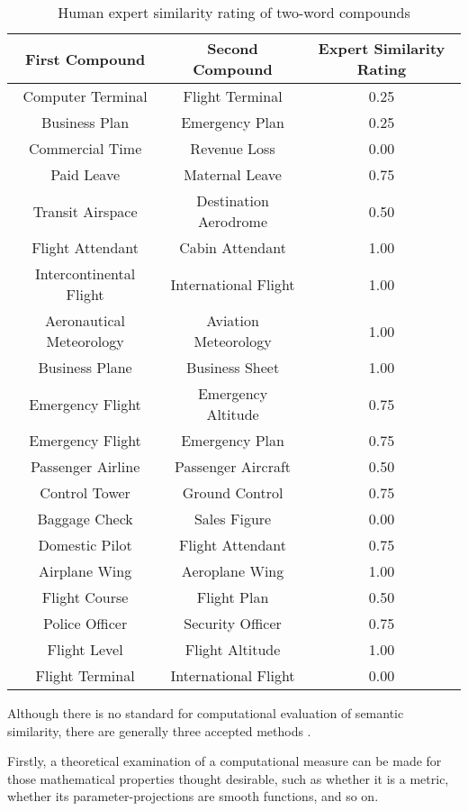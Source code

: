 \documentclass{article}
\begin{document}
\begin{table}[h!]
\centering
\begin{tabular}{|c|c||c|}
	\hline
	First Compound & Second Compound & Expert Similarity Rating \\
	\hline
	Computer Terminal & Flight Terminal & 0.25 \\
	Business Plan & Emergency Plan & 0.25 \\
	Commercial Time & Revenue Loss & 0.00 \\
	Paid Leave & Maternal Leave & 0.75 \\
	Transit Airspace & Destination Aerodrome & 0.50 \\
	Flight Attendant & Cabin Attendant & 1.00 \\
	Intercontinental Flight & International Flight & 1.00 \\
	Aeronautical Meteorology & Aviation Meteorology & 1.00 \\
	Business Plane & Business Sheet & 1.00 \\
	Emergency Flight & Emergency Altitude & 0.75 \\
	Emergency Flight & Emergency Plan & 0.75 \\
	Passenger Airline & Passenger Aircraft & 0.50 \\
	Control Tower & Ground Control & 0.75 \\
	Baggage Check & Sales Figure & 0.00 \\
	Domestic Pilot & Flight Attendant & 0.75 \\
	Airplane Wing & Aeroplane Wing & 1.00 \\
	Flight Course & Flight Plan & 0.50 \\
	Police Officer & Security Officer & 0.75 \\
	Flight Level & Flight Altitude & 1.00 \\
	Flight Terminal & International Flight & 0.00 \\
	\hline
\end{tabular}
\caption{Human expert similarity rating of two-word compounds}
\label{table:humancompoundsimilarity}
\end{table}

Although there is no standard for computational evaluation of semantic similarity, there are generally three accepted methods \citep{meng2013review}.

Firstly, a theoretical examination of a computational measure can be made for those mathematical properties thought desirable, such as whether it is a metric, whether its parameter-projections are smooth functions, and so on. %
\end{document}
